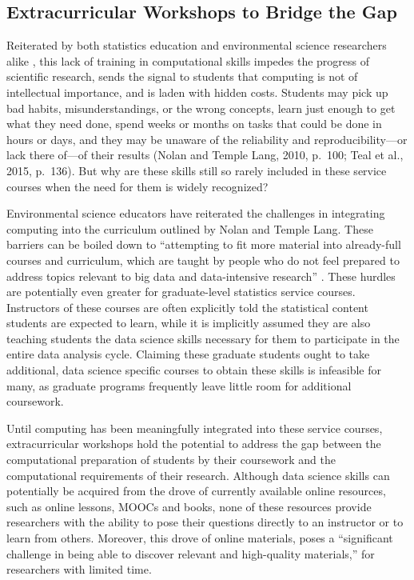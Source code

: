 \documentclass[12pt]{article}
\begin{document}
\subsection{Extracurricular Workshops to Bridge the Gap}

\quad Reiterated by both statistics education and environmental science 
researchers alike \citep{nolan, datacarpentry}, this lack of training in 
computational skills impedes the progress of scientific research, sends the 
signal to students that computing is not of intellectual importance, and is 
laden with hidden costs. Students may pick up bad habits, misunderstandings, or 
the wrong concepts, learn just enough to get what they need done, spend weeks or
months on tasks that could be done in hours or days, and they may be unaware of 
the reliability and reproducibility---or lack there of---of their results (Nolan
and Temple Lang, 2010, p.\ 100; Teal et al., 2015, p.\ 136). But why are these
skills still so rarely included in these service courses when the need for them
is widely recognized?

\quad Environmental science educators have reiterated the challenges in 
integrating computing into the curriculum outlined by Nolan and Temple Lang. 
These barriers can be boiled down to ``attempting to fit more material into
already-full courses and curriculum, which are taught by people who do not feel
prepared to address topics relevant to big data and data-intensive research'' 
\citep[p.\ 547]{hampton}. These hurdles are potentially even greater for 
graduate-level statistics service courses. Instructors of these courses are 
often explicitly told the statistical content students are expected to learn, 
while it is implicitly assumed they are also teaching students the data science
skills necessary for them to participate in the entire data analysis cycle.
Claiming these graduate students ought to take additional, data science specific
courses to obtain these skills is infeasible for many, as graduate programs
frequently leave little room for additional coursework. 

\quad Until computing has been meaningfully integrated into these service 
courses, extracurricular workshops hold the potential to address the gap between
the computational preparation of students by their coursework and the 
computational requirements of their research. Although data science skills can 
potentially be acquired from the drove of currently available online resources, 
such as online lessons, MOOCs and books, none of these resources provide
researchers with the ability to pose their questions directly to an instructor
or to learn from others. Moreover, this drove of online materials, poses a  
``significant challenge in being able to discover relevant and high-quality
materials,'' for researchers with limited time. 
\end{document}
